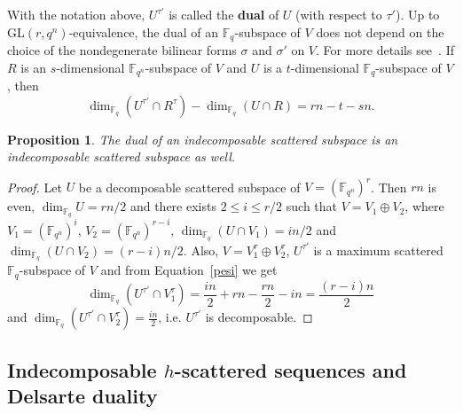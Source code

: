 \documentclass[11pt]{article}
\newtheorem{prop}[theo]{Proposition}
\theoremstyle{definition}
\numberwithin{equation}{section}
\begin{document}
	With the notation above, $U^{\tau '}$ is called the \textbf{dual} of $U$ (with respect to $\tau'$). 
	Up to $\mathrm{GL}(r,q^n)$-equivalence, the dual of an $\mathbb{F}_q$-subspace of $V$ does not depend on the choice of the nondegenerate bilinear forms $\sigma$ and $\sigma'$ on $V$. For more details see~\cite{polverino2010linear}. If $R$ is an $s$-dimensional ${\mathbb F}_{q^n}$-subspace of $V$ and $U$ is a $t$-dimensional $\mathbb{F}_q$-subspace of $V$, then
	\begin{equation}\label{pesi}
		\dim_{\mathbb{F}_q}(U^{\tau'}\cap R^\tau)-\dim_{\mathbb{F}_q}(U\cap R)=rn-t-sn.
	\end{equation}
	
	\begin{prop}
	The dual of an indecomposable scattered subspace is an indecomposable scattered subspace as well.
	\end{prop}
	
	\begin{proof}
	Let $U$ be a decomposable scattered subspace of $V=(\mathbb{F}_{q^n})^{r}$. Then $rn$ is even, $\dim_{\mathbb{F}_q} U=rn/2$ and there exists $2\leq i\leq r/2$ such that $V=V_1\oplus V_2$, where $V_1=(\mathbb{F}_{q^n})^{i}$, $V_2=(\mathbb{F}_{q^n})^{r-i}$, $\dim_{\mathbb{F}_q}(U\cap V_1)=in/2$ and $\dim_{\mathbb{F}_q}(U\cap V_2)=(r-i)n/2$. Also, $V=V_1^\tau\oplus V_2^\tau$, $U^{\tau'}$ is a maximum scattered $\mathbb{F}_q$-subspace of $V$ and from Equation~\eqref{pesi} we get
	\[\dim_{\mathbb{F}_q} (U^{\tau'}\cap V_1^{\tau})=\frac{in}{2}+rn-\frac{rn}{2}-in=\frac{(r-i)n}{2}\]
    and $\dim_{\mathbb{F}_q}(U^{\tau '}\cap V_2^\tau)=\frac{in}{2}$, i.e. $U^{\tau'}$ is decomposable.
	\end{proof}
	
\subsection{Indecomposable \texorpdfstring{$h$}{h}-scattered sequences and Delsarte duality}
\end{document}
